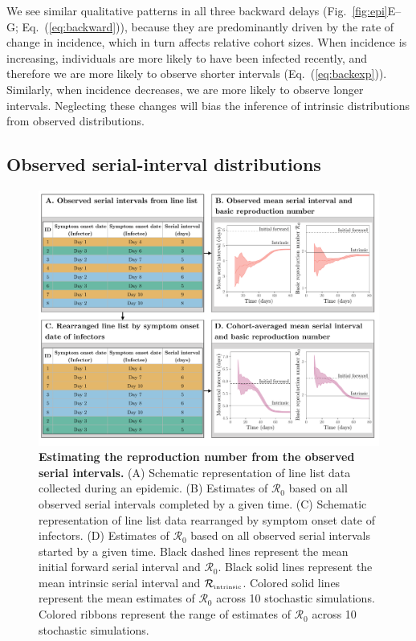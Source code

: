 \documentclass[12pt]{article}
\newcommand{\eref}[1]{Eq.~(\ref{eq:#1})}
\newcommand{\fref}[1]{Fig.~\ref{fig:#1}}
\newcommand{\Rx}[1]{\ensuremath{{\mathcal R}_{#1}}\xspace}
\newcommand{\Ro}{\Rx{0}}
\newcommand{\Rintrinsic}{\ensuremath{{\mathcal R}_{\textrm{\tiny intrinsic}}}\xspace}
\begin{document}
We see similar qualitative patterns in all three backward delays (\fref{epi}E--G; \eref{backward}), because they are predominantly driven by the rate of change in incidence, which in turn affects relative cohort sizes.
When incidence is increasing, individuals are more likely to have been infected recently, and therefore we are more likely to observe shorter intervals (\eref{backexp}).
Similarly, when incidence decreases, we are more likely to observe longer intervals.
Neglecting these changes will bias the inference of intrinsic distributions from observed distributions.

\subsection{Observed serial-interval distributions}

\begin{figure}[!ht]
\includegraphics[width=\textwidth]{diagram.pdf}
\caption{
\textbf{Estimating the reproduction number from the observed serial intervals.}
(A) Schematic representation of line list data collected during an epidemic.
(B) Estimates of \Ro based on all observed serial intervals completed by a given time.
(C) Schematic representation of line list data rearranged by symptom onset date of infectors.
(D) Estimates of \Ro based on all observed serial intervals started by a given time. 
Black dashed lines represent the mean initial forward serial interval and \Ro.
Black solid lines represent the mean intrinsic serial interval and \Rintrinsic.
Colored solid lines represent the mean estimates of \Ro across 10 stochastic simulations.
Colored ribbons represent the range of estimates of \Ro across 10 stochastic simulations.
}
\label{fig:obsrR}
\end{figure}
\end{document}
